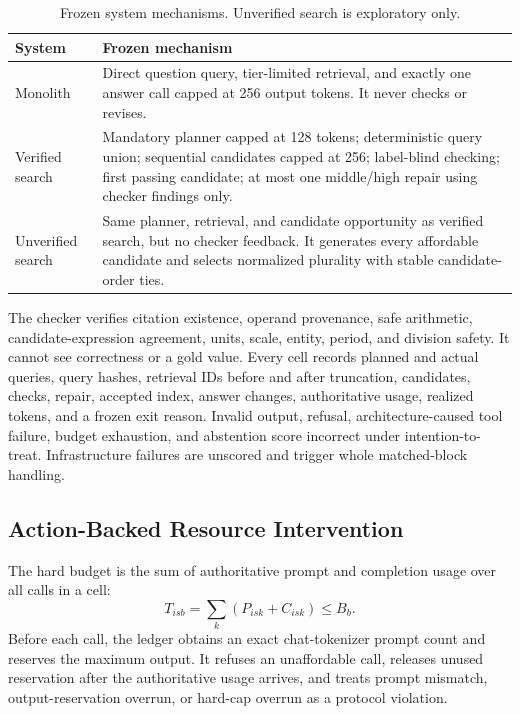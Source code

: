\begin{table}[H]
\centering
\small
\caption{Frozen system mechanisms. Unverified search is exploratory only.}
\label{tab:systems}
\begin{tabularx}{\linewidth}{@{}lY@{}}
\toprule
System & Frozen mechanism \\
\midrule
Monolith & Direct question query, tier-limited retrieval, and exactly one answer
call capped at 256 output tokens. It never checks or revises. \\
Verified search & Mandatory planner capped at 128 tokens; deterministic query
union; sequential candidates capped at 256; label-blind checking; first passing
candidate; at most one middle/high repair using checker findings only. \\
Unverified search & Same planner, retrieval, and candidate opportunity as
verified search, but no checker feedback. It generates every affordable
candidate and selects normalized plurality with stable candidate-order ties. \\
\bottomrule
\end{tabularx}
\end{table}

The checker verifies citation existence, operand provenance, safe arithmetic,
candidate-expression agreement, units, scale, entity, period, and division
safety. It cannot see correctness or a gold value. Every cell records planned
and actual queries, query hashes, retrieval IDs before and after truncation,
candidates, checks, repair, accepted index, answer changes, authoritative usage,
realized tokens, and a frozen exit reason. Invalid output, refusal,
architecture-caused tool failure, budget exhaustion, and abstention score
incorrect under intention-to-treat. Infrastructure failures are unscored and
trigger whole matched-block handling.

\subsection{Action-Backed Resource Intervention}

The hard budget is the sum of authoritative prompt and completion usage over all
calls in a cell:
\begin{equation}
T_{isb}=\sum_k(P_{isk}+C_{isk})\le B_b.
\label{eq:budget}
\end{equation}
Before each call, the ledger obtains an exact chat-tokenizer prompt count and
reserves the maximum output. It refuses an unaffordable call, releases unused
reservation after the authoritative usage arrives, and treats prompt mismatch,
output-reservation overrun, or hard-cap overrun as a protocol violation.

